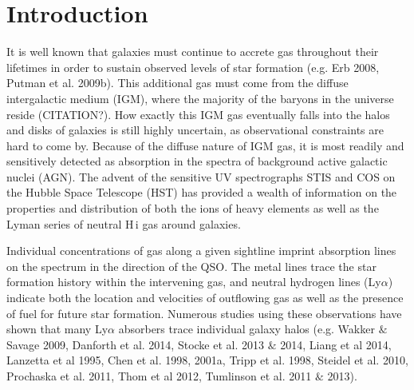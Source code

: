 \documentclass[iop]{emulateapj-rtx4}
\begin{document}
\section{Introduction}


It is well known that galaxies must continue to accrete gas throughout their lifetimes in order to sustain observed levels of star formation (e.g. Erb 2008, Putman et al. 2009b). This additional gas must come from the diffuse intergalactic medium (IGM), where the majority of the baryons in the universe reside (CITATION?). How exactly this IGM gas eventually falls into the halos and disks of galaxies is still highly uncertain, as observational constraints are hard to come by. Because of the diffuse nature of IGM gas, it is most readily and sensitively detected as absorption in the spectra of background active galactic nuclei (AGN). The advent of the sensitive UV spectrographs STIS and COS on the Hubble Space Telescope (HST) has provided a wealth of information on the properties and distribution of both the ions of heavy elements as well as the Lyman series of neutral H\,{\sc i} gas around galaxies. 

Individual concentrations of gas along a given sightline imprint absorption lines on the spectrum in the direction of the QSO. The metal lines trace the star formation history within the intervening gas, and neutral hydrogen lines (Ly$\alpha$) indicate both the location and velocities of outflowing gas as well as the presence of fuel for future star formation. Numerous studies using these observations have shown that many Ly$\alpha$ absorbers trace individual galaxy halos (e.g. Wakker $\&$ Savage 2009, Danforth et al. 2014, Stocke et al. 2013 $\&$ 2014, Liang et al 2014, Lanzetta et al 1995, Chen et al. 1998, 2001a, Tripp et al. 1998, Steidel et al. 2010, Prochaska et al. 2011, Thom et al 2012, Tumlinson et al. 2011 $\&$ 2013). 


\end{document}
